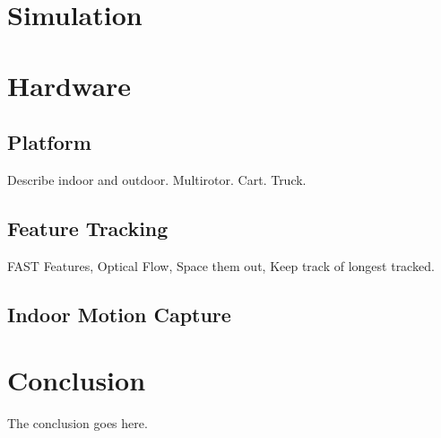 \documentclass[journal,onecolumn]{IEEEtran}
\begin{document}
\section{Simulation} \label{sec:simulation}


\section{Hardware} \label{sec:hardware}

\subsection{Platform}
Describe indoor and outdoor. Multirotor. Cart. Truck.

\subsection{Feature Tracking}
FAST Features, Optical Flow, Space them out, Keep track of longest tracked.

\subsection{Indoor Motion Capture}

\section{Conclusion}
The conclusion goes here.




% 
% 
\end{document}
